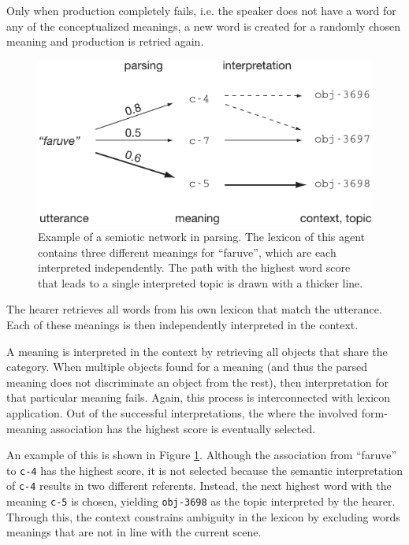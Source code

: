  Only when production completely fails,
i.e. the speaker does not have a word for any of the conceptualized
meanings, a new word is created for a randomly chosen meaning and
production is retried again.

\begin{figure}[t]
  \includegraphics{figures/sgg-semiotic-network-parsing}
  \caption{Example of a semiotic network in parsing. The lexicon of
    this agent contains three different meanings for ``faruve'', which
    are each interpreted independently. The path with the highest word
    score that leads to a single interpreted topic is drawn with a
    thicker line. }
  \label{f:sgg-semiotic-network-parsing}
\end{figure}

 The hearer retrieves all words from his own
lexicon that match the utterance. Each of these meanings is then
independently interpreted in the context.

 A meaning
is interpreted in the context by retrieving all objects that share the
category. When multiple objects found for a meaning (and thus the
parsed meaning does not discriminate an object from the rest), then
interpretation for that particular meaning fails. Again, this process
is interconnected with lexicon application. Out of the successful
interpretations, the where the involved form-meaning association has
the highest score is eventually selected. 

An example of this is shown in Figure
\ref{f:sgg-semiotic-network-parsing}. Although the association from
``faruve'' to \texttt{c-4} has the highest score, it is not selected
because the semantic interpretation of \texttt{c-4} results in two
different referents. Instead, the next highest word with the meaning
\texttt{c-5} is chosen, yielding \texttt{obj-3698} as the topic
interpreted by the hearer. Through this, the context constrains
ambiguity in the lexicon by excluding words meanings that are not in
line with the current scene.

